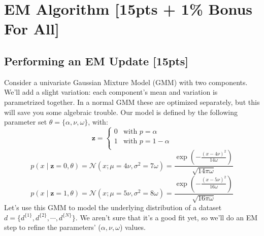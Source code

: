 \section{EM Algorithm [15pts + 1\% Bonus For All]}
\subsection{Performing an EM Update [15pts]}
Consider a univariate Gaussian Mixture Model (GMM) with two components. We'll add a slight variation: each component's mean and variation is parametrized together. In a normal GMM these are optimized separately, but this will save you some algebraic trouble. Our model is defined by the following parameter set $\theta=\{\alpha, \nu, \omega\}$, with:
$$\boldsymbol{z} = \begin{cases}
    0 &\text{with }p=\alpha \\
    1 &\text{with }p=1-\alpha \\
\end{cases}$$
$$p(x \mid \boldsymbol{z}=0, \theta) = \mathcal{N}(x; \mu=4\nu, \sigma^2=7\omega) = \frac{\exp\left(-\frac{(x-4\nu)^2}{14\omega}\right)}{\sqrt{14\pi\omega}}$$
$$p(x \mid \boldsymbol{z}=1, \theta) = \mathcal{N}(x; \mu=5\nu, \sigma^2=8\omega) = \frac{\exp\left(-\frac{(x-5\nu)^2}{16\omega}\right)}{\sqrt{16\pi\omega}}$$
Let's use this GMM to model the underlying distribution of a dataset $d=\{ d^{\{1\}}, d^{\{2\}}, \cdots, d^{\{N\}} \}$. We aren't sure that it's a good fit yet, so we'll do an EM step to refine the parameters' ($\alpha, \nu, \omega$) values.

